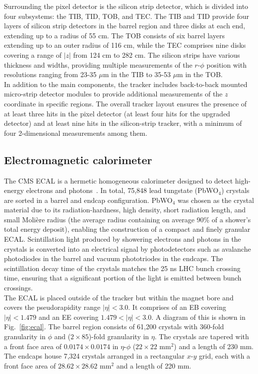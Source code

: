 Surrounding the pixel detector is the silicon strip detector, which is divided into four subsystems: the \ac{TIB}, \ac{TID}, \ac{TOB}, and \ac{TEC}. 
The \ac{TIB} and \ac{TID} provide four layers of silicon strip detectors in the barrel region and three disks at each end, extending up to a radius of 55 cm. 
The \ac{TOB} consists of six barrel layers extending up to an outer radius of 116 cm, while the \ac{TEC} comprises nine disks covering a range of $|z|$ from 124 cm to 282 cm. 
The silicon strips have various thickness and widths, providing multiple measurements of the $r$-$\phi$ position with resolutions ranging from 23-35 $\mu$m in the \ac{TIB} to 35-53 $\mu$m in the TOB. \\

In addition to the main components, the tracker includes back-to-back mounted micro-strip detector modules to provide additional measurements of the $z$ coordinate in specific regions. 
The overall tracker layout ensures the presence of at least three hits in the pixel detector (at least four hits for the upgraded detector) and at least nine hits in the silicon-strip tracker, with a minimum of four 2-dimensional measurements among them.

\subsection{Electromagnetic calorimeter}

The \ac{CMS} \ac{ECAL} is a hermetic homogeneous calorimeter designed to detect high-energy electrons and photons~\cite{CMS_Setup,CMS:2013lxn}. 
In total, 75,848 lead tungstate (PbWO$_4$) crystals are sorted in a barrel and endcap configuration. 
PbWO$_4$ was chosen as the crystal material due to its radiation-hardness, high density, short radiation length, and small Molière radius (the average radius containing on average 90\% of
a shower’s total energy deposit), enabling the construction of a compact and finely granular \ac{ECAL}. 
Scintillation light produced by showering electrons and photons in the crystals is converted into an electrical signal by photodetectors such as avalanche photodiodes in the barrel and vacuum phototriodes in the endcaps. 
The scintillation decay time of the crystals matches the 25 ns \ac{LHC} bunch crossing time, ensuring that a significant portion of the light is emitted between bunch crossings. \\

The \ac{ECAL} is placed outside of the tracker but within the magnet bore and covers the pseudorapidity range $|\eta| < 3.0$. 
It comprises of an \ac{EB} covering $|\eta| < 1.479$ and an \ac{EE} covering $1.479 < |\eta| < 3.0$. 
A diagram of this is shown in Fig.~\ref{fig:ecal}.
The barrel region consists of 61,200 crystals with 360-fold granularity in $\phi$ and ($2 \times 85$)-fold granularity in $\eta$. 
The crystals are tapered with a front face area of $0.0174 \times 0.0174$ in $\eta$-$\phi$ ($22 \times 22$ mm$^2$) and a length of 230 mm. 
The endcaps house 7,324 crystals arranged in a rectangular $x$-$y$ grid, each with a front face area of $28.62 \times 28.62$ mm$^2$ and a length of 220 mm. \\

